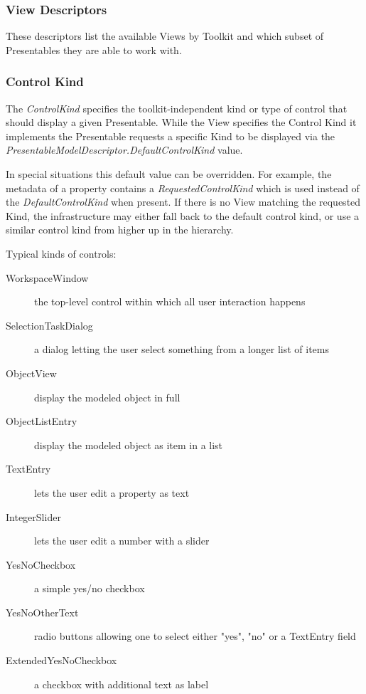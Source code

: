 \subsubsection{View Descriptors}

These descriptors list the available Views by Toolkit and which subset
of Presentables they are able to work with.

\subsubsection{Control Kind}

The \emph{ControlKind} specifies the toolkit-independent kind or type of
control that should display a given Presentable. While the View
specifies the Control Kind it implements the Presentable requests a
specific Kind to be displayed via the
\emph{PresentableModelDescriptor.DefaultControlKind} value.

In special situations this default value can be overridden. For example,
the metadata of a property contains a \emph{RequestedControlKind} which
is used instead of the \emph{DefaultControlKind} when present. If there
is no View matching the requested Kind, the infrastructure may either
fall back to the default control kind, or use a similar control kind
from higher up in the hierarchy.

Typical kinds of controls:

\begin{description}

\item[WorkspaceWindow] {the top-level control within which all user
interaction happens}

\item[SelectionTaskDialog] {a dialog letting the user select something
from a longer list of items}

\item[ObjectView] {display the modeled object in full}

\item[ObjectListEntry] {display the modeled object as item in a list}

\item[TextEntry] {lets the user edit a property as text}

\item[IntegerSlider] {lets the user edit a number with a slider}

\item[YesNoCheckbox] {a simple yes/no checkbox}

\item[YesNoOtherText] {radio buttons allowing one to select either "yes",
"no" or a TextEntry field}

\item[ExtendedYesNoCheckbox] {a checkbox with additional text as label}

\end{description}

